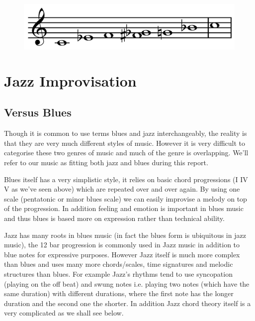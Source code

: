\documentclass[pdftex,12pt,a4paper]{report}
\begin{document}
\begin{figure}[here]
  \centering
  \includegraphics[scale=0.25]{figure/bluesminorhexatonicscale.png}
  \label{fig:cminorbluesscale}
\end{figure}

\section{Jazz Improvisation}

\subsection{Versus Blues}
Though it is common to use terms blues and jazz interchangeably, the reality is that they are very much different styles of music. However it is very difficult to categorise these two genres of music and much of the genre is overlapping. We'll refer to our music as fitting both jazz and blues during this report.

Blues itself has a very simplistic style, it relies on basic chord progressions (I IV V as we've seen above) which are repeated over and over again. By using one scale (pentatonic or minor blues scale) we can easily improvise a melody on top of the progression. In addition feeling and emotion is important in blues music and thus blues is based more on expression rather than technical ability. 

Jazz has many roots in blues music (in fact the blues form is ubiquitous in jazz music), the 12 bar progression is commonly used in Jazz music in addition to blue notes for expressive purposes. However Jazz itself is much more complex than blues and uses many more chords/scales, time signatures and melodic structures than blues. For example Jazz's rhythms tend to use syncopation (playing on the off beat) and swung notes i.e. playing two notes (which have the same duration) with different durations, where the first note has the longer duration and the second one the shorter. In addition Jazz chord theory itself is a very complicated as we shall see below.
\end{document}

